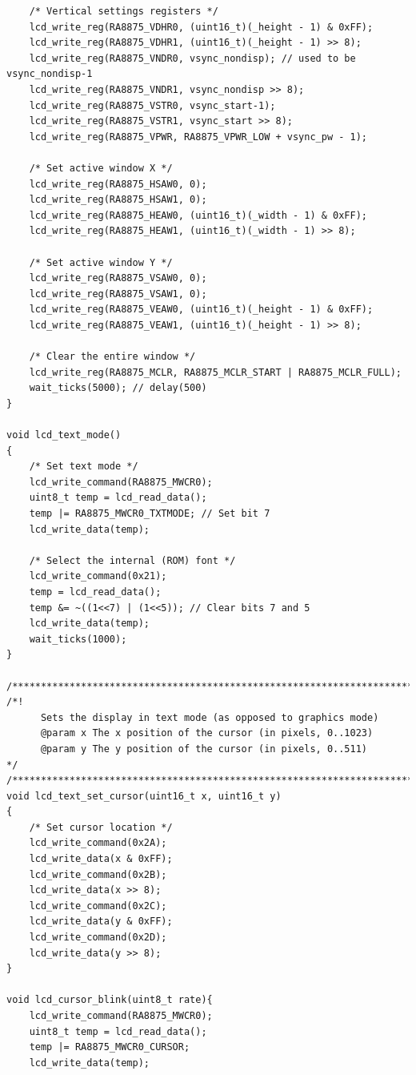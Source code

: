 \documentclass[a4paper, 12pt]{article}
\begin{document}
\begin{verbatim}
	/* Vertical settings registers */
	lcd_write_reg(RA8875_VDHR0, (uint16_t)(_height - 1) & 0xFF);
	lcd_write_reg(RA8875_VDHR1, (uint16_t)(_height - 1) >> 8);
	lcd_write_reg(RA8875_VNDR0, vsync_nondisp); // used to be vsync_nondisp-1   
	lcd_write_reg(RA8875_VNDR1, vsync_nondisp >> 8);
	lcd_write_reg(RA8875_VSTR0, vsync_start-1);                            
	lcd_write_reg(RA8875_VSTR1, vsync_start >> 8);
	lcd_write_reg(RA8875_VPWR, RA8875_VPWR_LOW + vsync_pw - 1);           

	/* Set active window X */
	lcd_write_reg(RA8875_HSAW0, 0);                                       
	lcd_write_reg(RA8875_HSAW1, 0);
	lcd_write_reg(RA8875_HEAW0, (uint16_t)(_width - 1) & 0xFF);          
	lcd_write_reg(RA8875_HEAW1, (uint16_t)(_width - 1) >> 8);

	/* Set active window Y */
	lcd_write_reg(RA8875_VSAW0, 0);                                      
	lcd_write_reg(RA8875_VSAW1, 0);
	lcd_write_reg(RA8875_VEAW0, (uint16_t)(_height - 1) & 0xFF);         
	lcd_write_reg(RA8875_VEAW1, (uint16_t)(_height - 1) >> 8);

	/* Clear the entire window */
	lcd_write_reg(RA8875_MCLR, RA8875_MCLR_START | RA8875_MCLR_FULL);
	wait_ticks(5000); // delay(500)
}

void lcd_text_mode()
{
	/* Set text mode */
	lcd_write_command(RA8875_MWCR0);
	uint8_t temp = lcd_read_data();
	temp |= RA8875_MWCR0_TXTMODE; // Set bit 7
	lcd_write_data(temp);

	/* Select the internal (ROM) font */
	lcd_write_command(0x21);
	temp = lcd_read_data();
	temp &= ~((1<<7) | (1<<5)); // Clear bits 7 and 5
	lcd_write_data(temp);
	wait_ticks(1000);
}

/**************************************************************************/
/*!
      Sets the display in text mode (as opposed to graphics mode)
      @param x The x position of the cursor (in pixels, 0..1023)
      @param y The y position of the cursor (in pixels, 0..511)
*/
/**************************************************************************/
void lcd_text_set_cursor(uint16_t x, uint16_t y)
{
	/* Set cursor location */
	lcd_write_command(0x2A);
	lcd_write_data(x & 0xFF);
	lcd_write_command(0x2B);
	lcd_write_data(x >> 8);
	lcd_write_command(0x2C);
	lcd_write_data(y & 0xFF);
	lcd_write_command(0x2D);
	lcd_write_data(y >> 8);
}

void lcd_cursor_blink(uint8_t rate){
	lcd_write_command(RA8875_MWCR0);
	uint8_t temp = lcd_read_data();
	temp |= RA8875_MWCR0_CURSOR;
	lcd_write_data(temp);


\end{verbatim}
\end{document}
